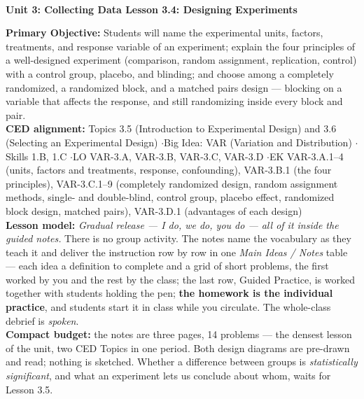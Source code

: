 \documentclass[10pt]{article}
\newcommand{\UnitNumberName}{Unit 3: Collecting Data \quad}
\newcommand{\LessonNumberName}{Lesson 3.4: Designing Experiments}
\begin{document}
\begin{center}
    {\Large\bfseries \CourseName \\
    {\small\bfseries \UnitNumberName \LessonNumberName}}
\end{center}

\begin{tcolorbox}[colback=sky, colframe=navy, boxrule=0.9pt, arc=2mm,
    left=2mm, right=2mm, top=1.5mm, bottom=1.5mm]
    \textbf{Primary Objective:} Students will name the experimental units, factors, treatments,
    and response variable of an experiment; explain the four principles of a well-designed
    experiment (comparison, random assignment, replication, control) with a control group,
    placebo, and blinding; and choose among a completely randomized, a randomized block, and a
    matched pairs design --- blocking on a variable that affects the response, and still
    randomizing inside every block and pair.
    \\[2pt]
    \textbf{CED alignment:} Topics 3.5 (Introduction to Experimental Design) and 3.6 (Selecting
    an Experimental Design) \quad$\cdot$\quad Big Idea: VAR (Variation and Distribution)
    \quad$\cdot$\quad Skills 1.B, 1.C \quad$\cdot$\quad LO VAR-3.A, VAR-3.B, VAR-3.C, VAR-3.D
    \quad$\cdot$\quad EK VAR-3.A.1--4 (units, factors and treatments, response, confounding),
    VAR-3.B.1 (the four principles), VAR-3.C.1--9 (completely randomized design, random
    assignment methods, single- and double-blind, control group, placebo effect, randomized
    block design, matched pairs), VAR-3.D.1 (advantages of each design)
    \\[2pt]
    \textbf{Lesson model:} \emph{Gradual release --- I do, we do, you do --- all of it inside
    the guided notes.} There is no group activity. The notes name the vocabulary as they teach
    it and deliver the instruction row by row in one \emph{Main Ideas / Notes} table --- each
    idea a definition to complete and a grid of short problems, the first worked by you and the
    rest by the class; the last row, Guided Practice, is worked together with students holding
    the pen; \textbf{the homework is the individual practice}, and students start it in class
    while you circulate. The whole-class debrief is \emph{spoken}.
    \\[2pt]
    \textbf{Compact budget:} the notes are three pages, 14 problems --- the densest lesson of
    the unit, two CED Topics in one period. Both design diagrams are pre-drawn and read;
    nothing is sketched. Whether a difference between groups is \emph{statistically
    significant}, and what an experiment lets us conclude about whom, waits for Lesson 3.5.
\end{tcolorbox}
\end{document}
